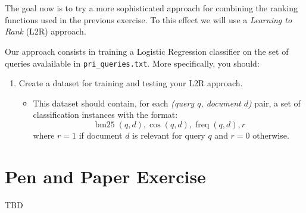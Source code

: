 \documentclass[12pt]{article}
\begin{document}
\section{}

The goal now is to try a more sophisticated approach for combining the ranking functions used in the previous exercise. To this effect we will use a \emph{Learning to Rank} (L2R) approach.

Our approach consists in training a Logistic Regression classifier on the set of queries avalailable in \texttt{pri\_queries.txt}. More specifically, you should:
\begin{enumerate}
\item Create a dataset for training and testing your L2R approach.
    \begin{itemize}
    \item This dataset should contain, for each \textit{(query $q$, document $d$)} pair, a set of classification instances with the format:
        \begin{displaymath}
            \operatorname{bm25}(q,d), \operatorname{cos}(q,d), \operatorname{freq}(q,d), r
        \end{displaymath}
        where $r = 1$ if document $d$ is relevant for query $q$ and $r=0$ otherwise.
    \end{itemize}

\end{enumerate}



\section{Pen and Paper Exercise}

TBD
\end{document}
